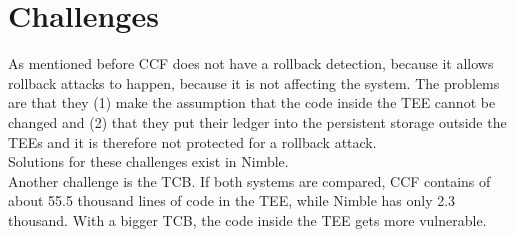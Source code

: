 \section{Challenges}
\label{challenges:ccf}
As mentioned before CCF does not have a rollback detection, because it allows rollback attacks to happen, because it is not affecting the system. The problems are that they (1) make the assumption that the code inside the TEE cannot be changed and (2) that they put their ledger into the persistent storage outside the TEEs and  it is therefore not protected for a rollback attack.\\
Solutions for these challenges exist in Nimble.\\
Another challenge is the TCB. If both systems are compared, CCF contains of about 55.5 thousand lines of code in the TEE, while Nimble has only 2.3 thousand. With a bigger TCB, the code inside the TEE gets more vulnerable.